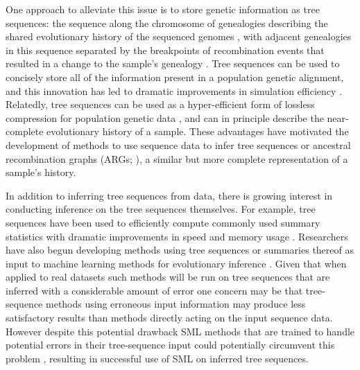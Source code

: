 One approach to alleviate this issue is to store genetic information as tree sequences: the sequence along the chromosome of genealogies describing the shared evolutionary history of the sequenced genomes \cite{kelleherEfficientCoalescentSimulation2016}, with adjacent genealogies in this sequence separated by the breakpoints of recombination events that resulted in a change to the sample's genealogy \cite{wiufRecombinationPointProcess1999}. Tree sequences can be used to concisely store all of the information present in a population genetic alignment, and this innovation has led to dramatic improvements in simulation efficiency \cite{hallerSLiMMultispeciesEcoEvolutionary2022,kelleherEfficientPedigreeRecording2018}. Relatedly, tree sequences can be used as a hyper-efficient form of lossless compression for population genetic data \cite{kelleherInferringWholegenomeHistories2019}, and can in principle describe the near-complete evolutionary history of a sample. These advantages have motivated the development of methods to use sequence data to infer tree sequences \cite{kelleherInferringWholegenomeHistories2019,speidelMethodGenomewideGenealogy2019a,zhangBiobankscaleInferenceAncestral2023a} or ancestral recombination graphs (ARGs; \cite{mahmoudiBayesianInferenceAncestral2022,rasmussenGenomeWideInferenceAncestral2014}), a similar but more complete representation of a sample's history. 

In addition to inferring tree sequences from data, there is growing interest in conducting inference on the tree sequences themselves. For example, tree sequences have been used to efficiently compute commonly used summary statistics with dramatic improvements in speed and memory usage \cite{ralphEfficientlySummarizingRelationships2020}. Researchers have also begun developing methods using tree sequences or summaries thereof as input to machine learning methods for evolutionary inference \cite{hejaseDeepLearningApproachInference2022,korfmannSimultaneousInferenceDemography2023,pearsonLocalAncestryInference2023}. Given that when applied to real datasets such methods will be run on tree sequences that are inferred with a considerable amount of error \cite{zhangBiobankscaleInferenceAncestral2023a} one concern may be that tree-sequence methods using erroneous input information may produce less satisfactory results than methods directly acting on the input sequence data. However despite this potential drawback SML methods that are trained to handle potential errors in their tree-sequence input could potentially circumvent this problem \cite{moDomainadaptiveNeuralNetworks2023}, resulting in successful use of SML on inferred tree sequences.

